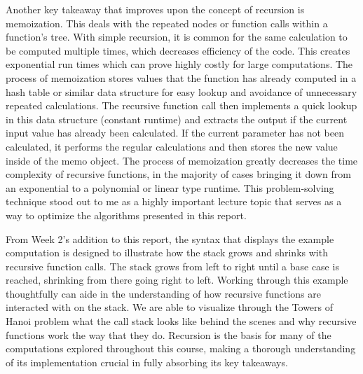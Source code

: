 \documentclass{article}
\theoremstyle{theorem}
\theoremstyle{definition}
\theoremstyle{remark}
\begin{document}
Another key takeaway that improves upon the concept of recursion is memoization. This deals with the repeated nodes or function calls within a function's tree. With simple recursion, it is common for the same calculation to be computed multiple times, which decreases efficiency of the code. This creates exponential run times which can prove highly costly for large computations. The process of memoization stores values that the function has already computed in a hash table or similar data structure for easy lookup and avoidance of unnecessary repeated calculations. The recursive function call then implements a quick lookup in this data structure (constant runtime) and extracts the output if the current input value has already been calculated. If the current parameter has not been calculated, it performs the regular calculations and then stores the new value inside of the memo object. The process of memoization greatly decreases the time complexity of recursive functions, in the majority of cases bringing it down from an exponential to a polynomial or linear type runtime. This problem-solving technique stood out to me as a highly important lecture topic that serves as a way to optimize the algorithms presented in this report.

From Week 2's addition to this report, the syntax that displays the example computation is designed to illustrate how the stack grows and shrinks with recursive function calls. The stack grows from left to right until a base case is reached, shrinking from there going right to left. Working through this example thoughtfully can aide in the understanding of how recursive functions are interacted with on the stack. We are able to visualize through the Towers of Hanoi problem what the call stack looks like behind the scenes and why recursive functions work the way that they do. Recursion is the basis for many of the computations explored throughout this course, making a thorough understanding of its implementation crucial in fully absorbing its key takeaways. 
\end{document}
